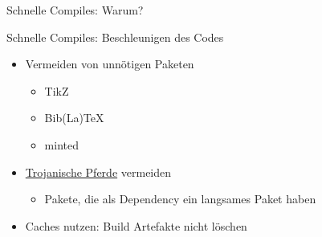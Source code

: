 \documentclass[main.tex]{subfiles}
\begin{document}
\begin{frame}{Schnelle Compiles: Warum?}
{\begin{center}
        \end{center}
    }

\end{frame}

\begin{frame}{Schnelle Compiles: Beschleunigen des Codes}
    \begin{itemize}
        \item Vermeiden von unnötigen Paketen
        \begin{itemize}
            \item TikZ
            \item Bib(La)\TeX
            \item minted
        \end{itemize}
        \pause
        \medskip
        \item \href{https://tex.stackexchange.com/a/8793}{Trojanische Pferde} vermeiden
        \begin{itemize}
            \item Pakete, die als Dependency ein langsames Paket haben
        \end{itemize}
        \pause
        \medskip
        \item Caches nutzen: Build Artefakte nicht löschen
    \end{itemize}
\end{frame}
\end{document}

